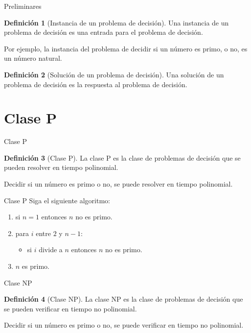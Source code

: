 \documentclass[dvipsnames, 11pt]{beamer}
\theoremstyle{plain}
\theoremstyle{definition}
\newtheorem{defi}{Definición}
\begin{document}
\begin{frame}{Preliminares}
    \begin{defi}[Instancia de un problema de decisión]
        Una instancia de un problema de decisión es una entrada para el problema de decisión.
    \end{defi}
    \pause
    Por ejemplo, la instancia del problema de decidir si un número es primo, o no, es un número natural.

    \begin{defi}[Solución de un problema de decisión]
        Una solución de un problema de decisión es la respuesta al problema de decisión.
    \end{defi}
\end{frame}

\section{Clase P}
\begin{frame}{Clase P}
    \begin{defi}[Clase P]
        La clase P es la clase de problemas de decisión que se pueden resolver en tiempo polinomial.
    \end{defi}
    \pause
    Decidir si un número es primo o no, se puede resolver en tiempo polinomial.
\end{frame}

\begin{frame}{Clase P}
    Siga el siguiente algoritmo:\pause
    \begin{enumerate}
        \item si $n = 1$ entonces $n$ no es primo.\pause
        \item para $i$ entre $2$ y $n -1$:
        \pause
        \begin{itemize}
            \item si $i$ divide a $n$ entonces $n$ no es primo.
        \end{itemize}
        \pause
        \item $n$ es primo.
    \end{enumerate}    
\end{frame}

\begin{frame}{Clase NP}
    \begin{defi}[Clase NP]
        La clase NP es la clase de problemas de decisión que se pueden verificar en tiempo no polinomial.
    \end{defi}
    \pause
    Decidir si un número es primo o no, se puede verificar en tiempo no polinomial.
\end{frame}
\end{document}
